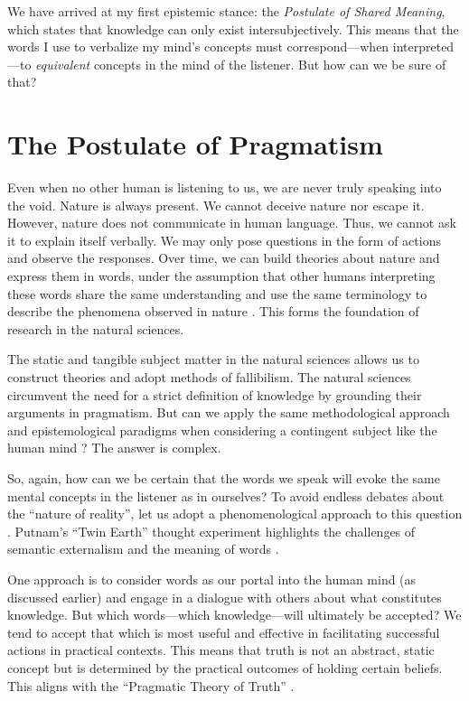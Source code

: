 We have arrived at my first epistemic stance: the \textit{Postulate of Shared Meaning}, which states that knowledge can only exist intersubjectively. This means that the words I use to verbalize my mind's concepts must correspond—when interpreted—to \textit{equivalent} concepts in the mind of the listener. But how can we be sure of that?

\section*{The Postulate of Pragmatism}

Even when no other human is listening to us, we are never truly speaking into the void. Nature is always present. We cannot deceive nature nor escape it. However, nature does not communicate in human language. Thus, we cannot ask it to explain itself verbally. We may only pose questions in the form of actions and observe the responses. Over time, we can build theories about nature and express them in words, under the assumption that other humans interpreting these words share the same understanding and use the same terminology to describe the phenomena observed in nature \parencite[1011b]{aristotle2009metaphysics}. This forms the foundation of research in the natural sciences.

The static and tangible subject matter in the natural sciences allows us to construct theories and adopt methods of fallibilism. The natural sciences circumvent the need for a strict definition of knowledge by grounding their arguments in pragmatism. But can we apply the same methodological approach and epistemological paradigms when considering a contingent subject like the human mind \parencite{frank2007introduction}? The answer is complex.

So, again, how can we be certain that the words we speak will evoke the same mental concepts in the listener as in ourselves? To avoid endless debates about the \enquote{nature of reality}, let us adopt a phenomenological approach to this question \parencite{husserl2002ideas}. Putnam's \enquote{Twin Earth} thought experiment highlights the challenges of semantic externalism and the meaning of words \parencite{putnam1975meaning}.

One approach is to consider words as our portal into the human mind (as discussed earlier) and engage in a dialogue with others about what constitutes knowledge. But which words—which knowledge—will ultimately be accepted? We tend to accept that which is most useful and effective in facilitating successful actions in practical contexts. This means that truth is not an abstract, static concept but is determined by the practical outcomes of holding certain beliefs. This aligns with the \enquote{Pragmatic Theory of Truth} \parencite{james1907pragmatism,capps2023pragmatic}.

